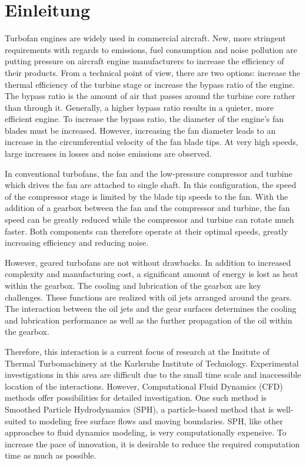 \cleardoublepage


\chapter{Einleitung}
\label{Chapter: Einleitung}

Turbofan engines are widely used in commercial aircraft.  New, more stringent requirements with regards to emissions, fuel consumption and noise pollution are putting pressure on aircraft engine manufacturers to increase the efficiency of their products. From a technical point of view, there are two options: increase the thermal efficiency of the turbine stage or increase the bypass ratio of the engine. The bypass ratio is the amount of air that passes around the turbine core rather than through it.  Generally, a higher bypass ratio results in a quieter, more efficient engine. To increase the bypass ratio, the diameter of the engine's fan blades must be increased.  However, increasing the fan diameter leads to an increase in the circumferential velocity of the fan blade tips.  At very high speeds, large increases in losses and noise emissions are observed.

In conventional turbofans, the fan and the low-pressure compressor and turbine which drives the fan are attached to single shaft.  In this configuration, the speed of the compressor stage is limited by the blade tip speeds to the fan.  With the addition of a gearbox between the fan and the compressor and turbine, the fan speed can be greatly reduced while the compressor and turbine can rotate much faster.  Both components can therefore operate at their optimal speeds, greatly increasing efficiency and reducing noise.

However, geared turbofans are not without drawbacks.  In addition to increased complexity and manufacturing cost, a significant amount of energy is lost as heat within the gearbox.  The cooling and lubrication of the gearbox are key challenges.  These functions are realized with oil jets arranged around the gears.  The interaction between the oil jets and the gear surfaces determines the cooling and lubrication performance as well as the further propagation of the oil within the gearbox.

Therefore, this interaction is a current focus of research at the Insitute of Thermal Turbomachinery at the Karlsruhe Institute of Technology.  Experimental investigations in this area are difficult due to the small time scale and inaccessible location of the interactions. However, Computational Fluid Dynamics (CFD) methods offer possibilities for detailed investigation. One such method is Smoothed Particle Hydrodynamics (SPH), a particle-based method that is well-suited to modeling free surface flows and moving boundaries.  SPH, like other approaches to fluid dynamics modeling, is very computationally expensive. To increase the pace of innovation, it is desirable to reduce the required computation time as much as possible.

